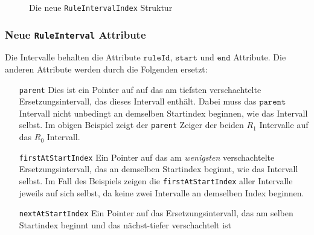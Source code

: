 \begin{figure}[H]
    \centering
    \caption{Die neue \texttt{RuleIntervalIndex} Struktur}
    \label{newrii}
\end{figure}

\subsubsection{Neue \texttt{RuleInterval} Attribute}

Die Intervalle behalten die Attribute $\texttt{ruleId}$, $\texttt{start}$ und $\texttt{end}$ Attribute. Die anderen Attribute werden durch die Folgenden ersetzt:

\begin{itemize}[leftmargin=3cm]
    \item[\texttt{parent}] Dies ist ein Pointer auf auf das am tiefsten verschachtelte Ersetzungsintervall, das dieses Intervall enthält. Dabei muss das $\texttt{parent}$ Intervall nicht unbedingt an demselben Startindex beginnen, wie das Intervall selbst. Im obigen Beispiel zeigt der \texttt{parent} Zeiger der beiden $R_1$ Intervalle auf das $R_0$ Intervall.
    \item[\texttt{firstAtStartIndex}] Ein Pointer auf das am \textit{wenigsten} verschachtelte Ersetzungsintervall, das an demselben Startindex beginnt, wie das Intervall selbst. Im Fall des Beispiels zeigen die \texttt{firstAtStartIndex} aller Intervalle jeweils auf sich selbst, da keine zwei Intervalle an demselben Index beginnen.
    \item[\texttt{nextAtStartIndex}] Ein Pointer auf das Ersetzungsintervall, das am selben Startindex beginnt und das nächst-tiefer verschachtelt ist
\end{itemize}

